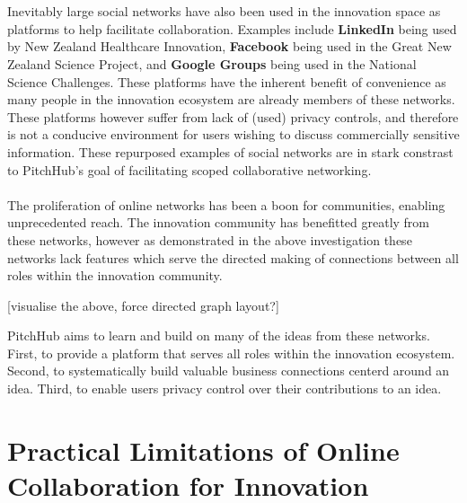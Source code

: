 \\
\\
Inevitably large social networks have also been used in the innovation space as platforms to help facilitate collaboration. Examples include \textbf{LinkedIn} being used by New Zealand Healthcare Innovation, \textbf{Facebook} being used in the Great New Zealand Science Project, and \textbf{Google Groups} being used in the National Science Challenges. These platforms have the inherent benefit of convenience as many people in the innovation ecosystem are already members of these networks. These platforms however suffer from lack of (used) privacy controls, and therefore is not a conducive environment for users wishing to discuss commercially sensitive information. These repurposed examples of social networks are in stark constrast to PitchHub's goal of facilitating scoped collaborative networking.
\\
\\
The proliferation of online networks has been a boon for communities, enabling unprecedented reach. The innovation community has benefitted greatly from these networks, however as demonstrated in the above investigation these networks lack features which serve the directed making of connections between all roles within the innovation community.

[visualise the above, force directed graph layout?]

PitchHub aims to learn and build on many of the ideas from these networks. First, to provide a platform that serves all roles within the innovation ecosystem. Second, to systematically build valuable business connections centerd around an idea. Third, to enable users privacy control over their contributions to an idea.

\section{Practical Limitations of Online Collaboration for Innovation}